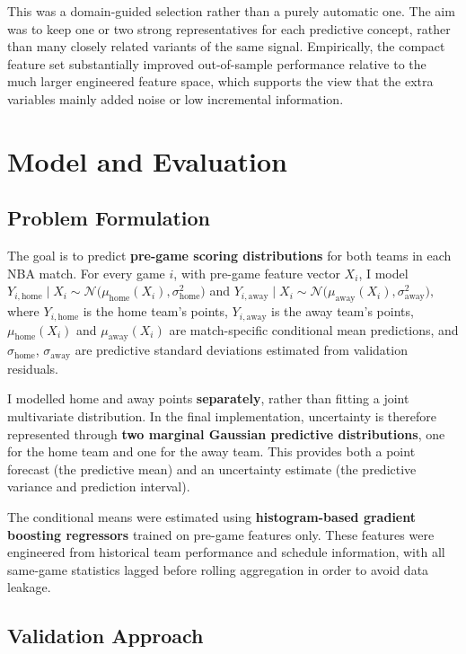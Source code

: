 \documentclass{article}
\begin{document}
This was a domain-guided selection rather than a purely automatic one. The aim was to keep one or two strong representatives for each predictive concept, rather than many closely related variants of the same signal. Empirically, the compact feature set substantially improved out-of-sample performance relative to the much larger engineered feature space, which supports the view that the extra variables mainly added noise or low incremental information.
\section{Model and Evaluation}
\subsection{Problem Formulation}

The goal is to predict \textbf{pre-game scoring distributions} for both teams in each NBA match.
For every game $i$, with pre-game feature vector $X_i$, I model
$
Y_{i,\text{home}} \mid X_i \sim \mathcal{N}\big(\mu_{\text{home}}(X_i), \sigma_{\text{home}}^2\big)
$
and
$
Y_{i,\text{away}} \mid X_i \sim \mathcal{N}\big(\mu_{\text{away}}(X_i), \sigma_{\text{away}}^2\big),
$
where $Y_{i,\text{home}}$ is the home team's points, $Y_{i,\text{away}}$ is the away team's points, $\mu_{\text{home}}(X_i)$ and $\mu_{\text{away}}(X_i)$ are match-specific conditional mean predictions, and $\sigma_{\text{home}}$, $\sigma_{\text{away}}$ are predictive standard deviations estimated from validation residuals.

I modelled home and away points \textbf{separately}, rather than fitting a joint multivariate distribution. In the final implementation, uncertainty is therefore represented through \textbf{two marginal Gaussian predictive distributions}, one for the home team and one for the away team. This provides both a point forecast (the predictive mean) and an uncertainty estimate (the predictive variance and prediction interval).

The conditional means were estimated using \textbf{histogram-based gradient boosting regressors} trained on pre-game features only. These features were engineered from historical team performance and schedule information, with all same-game statistics lagged before rolling aggregation in order to avoid data leakage.

\subsection{Validation Approach}
\end{document}

